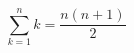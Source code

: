 \begin{equation}
    \label{eq:formula-sum-1-to-n}
    \sum_{k=1}^{n} k = \dfrac{n(n+1)}{2}
\end{equation}
